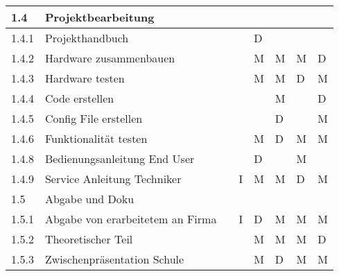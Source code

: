 \begin{longtable}{p{} p{} p{} p{}  p{} p{} p{} p{}}
	\rowcolor{mygray2}1.4 & Projektbearbeitung & & & & & & \\ \midrule
	1.4.1 & Projekthandbuch & & & D & & &  \\ \midrule
	1.4.2 & Hardware zusammenbauen & & & M & M & M & D \\ \midrule
	1.4.3 & Hardware testen & & & M & M & D & M \\ \midrule
	1.4.4 & Code erstellen & & & & M & & D \\ \midrule
	1.4.5 & Config File erstellen & & & & D & & M \\ \midrule
	1.4.6 & Funktionalität testen & & & M & D & M  & M \\ \midrule
	1.4.8 & Bedienungsanleitung End User & & & D & & M & \\ \midrule
	1.4.9 & Service Anleitung Techniker & & I & M & M & D & M \\ \midrule
	\rowcolor{mygray2}1.5 & Abgabe und Doku & & & & & & \\ \midrule
	1.5.1 & Abgabe von erarbeitetem an Firma & & I & D & M & M & M \\ \midrule
	1.5.2 & Theoretischer Teil & & & M & M & M & D \\ \midrule
	1.5.3 & Zwischenpräsentation Schule & & & M & D & M & M \\ 
\end{longtable}